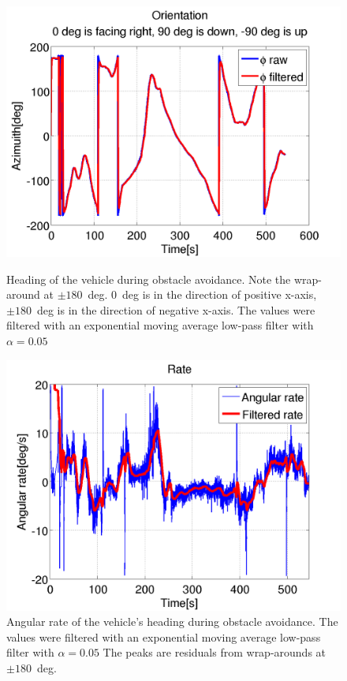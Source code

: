 \begin{figure}
\centering
{}
\includegraphics[width=\textwidth]{Files/Figures/oavoidance_2016-05-09_12-04-15-orientation.png}
\caption[Orientation during obstacle avoidance]{Heading of the vehicle during obstacle avoidance. Note the wrap-around at $\pm180$~deg. 0~deg is in the direction of positive x-axis, $\pm180$~deg is in the direction of negative x-axis. The values were filtered with an exponential moving average low-pass filter with $\alpha=0.05$}
\label{fig:obstacle_avoidance_orientation}
\endminipage\hfill
{}
\includegraphics[width=\textwidth]{Files/Figures/oavoidance_2016-05-09_12-04-15-ang_rate.png}
\caption[Angular rate during obstacle avoidance]{Angular rate of the vehicle's heading during obstacle avoidance. The values were filtered with an exponential moving average low-pass filter with $\alpha=0.05$ The peaks are residuals from wrap-arounds at $\pm180$~deg.\newline}
\label{fig:obstacle_avoidance_ang_rate}
\endminipage\hfill
\end{figure}

